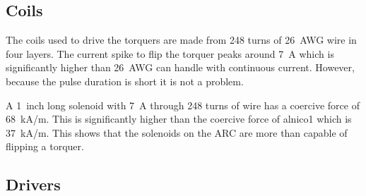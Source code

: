 \subsection{Coils}

The coils used to drive the torquers are made from 248 turns of 26~AWG wire in four layers. The current spike to flip the torquer peaks around 7~A which is significantly higher than 26~AWG can handle with continuous current. However, because the pulse duration is short it is not a problem.

A 1~inch long solenoid with 7~A through 248 turns of wire has a coercive force of 68~kA/m. This is significantly higher than the coercive force of alnico1 which is 37~kA/m\cite{AlnicoProp}. This shows that the solenoids on the \ac{ARC} are more than capable of flipping a torquer.

\subsection{Drivers}

